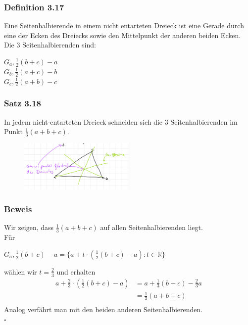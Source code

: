 \documentclass{article}
\begin{document}
\subsubsection*{Definition 3.17}
Eine Seitenhalbierende in einem nicht entarteten Dreieck ist eine Gerade durch eine der Ecken des Dreiecks sowie den Mittelpunkt der anderen beiden Ecken. \\
Die 3 Seitenhalbierenden sind: \\
\begin{center}
    $G_a,\frac{1}{2}(b+c)-a$ \\
    $G_b,\frac{1}{2}(a+c)-b$ \\
    $G_c,\frac{1}{2}(a+b)-c$ \\
\end{center}

\subsubsection*{Satz 3.18}
In jedem nicht-entarteten Dreieck schneiden sich die 3 Seitenhalbierenden im Punkt $\frac{1}{3}(a+b+c)$. \\
\begin{figure}[h]
    \centering
    \includegraphics[width=0.5\textwidth]{Images/3.18.jpeg}
    \caption{}
\end{figure}

\subsubsection*{Beweis}
Wir zeigen, dass $\frac{1}{3}(a+b+c)$ auf allen Seitenhalbierenden liegt. \\
Für \\
\begin{center}
    $G_a, \frac{1}{2}(b+c)-a = \{a+t \cdot (\frac{1}{2}(b+c)-a): t \in \mathbb{R}\}$ \\
\end{center}
wählen wir $t = \frac{2}{3}$ und erhalten \\
\begin{align*}
    a + \frac{2}{3} \cdot (\frac{1}{2}(b+c)-a) &= a + \frac{1}{3}(b+c) - \frac{2}{3}a \\
    &= \frac{1}{3}(a+b+c)\\
\end{align*}
Analog verfährt man mit den beiden anderen Seitenhalbierenden. \\
$\square$ \\
\\
\end{document}
